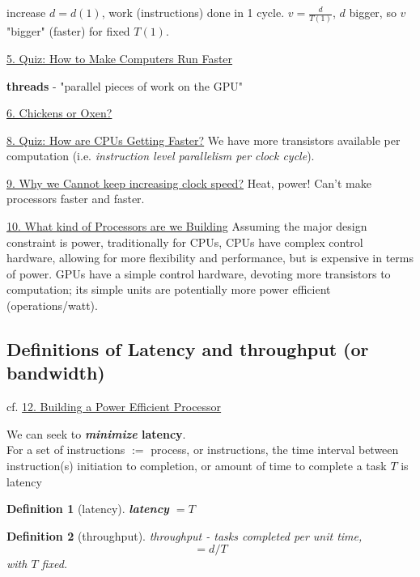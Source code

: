 \documentclass[10pt]{amsart}
\newtheorem{definition}{Definition}
\begin{document}
\begin{multicols*}{2}
increase $d=d(1)$, work (instructions) done in 1 cycle.  $v=\frac{d}{T(1)}$, $d$ bigger, so $v$ "bigger" (faster) for fixed $T(1)$.  

\href{https://classroom.udacity.com/courses/cs344/lessons/55120467/concepts/659387650923}{5. Quiz: How to Make Computers Run Faster} 

\textbf{threads} - "parallel pieces of work on the GPU"

\href{https://classroom.udacity.com/courses/cs344/lessons/55120467/concepts/670611900923}{6. Chickens or Oxen?}

\href{https://classroom.udacity.com/courses/cs344/lessons/55120467/concepts/668222780923}{8. Quiz: How are CPUs Getting Faster?}  We have more transistors available per computation (i.e. \emph{instruction level parallelism per clock cycle}).  

\href{https://classroom.udacity.com/courses/cs344/lessons/55120467/concepts/670462960923}{9. Why we Cannot keep increasing clock speed?} Heat, power!  Can't make processors faster and faster.  

\href{https://classroom.udacity.com/courses/cs344/lessons/55120467/concepts/668323280923}{10. What kind of Processors are we Building} Assuming the major design constraint is power, traditionally for CPUs, CPUs have complex control hardware, allowing for more flexibility and performance, but is expensive in terms of power.  GPUs have a simple control hardware, devoting more transistors to computation; its simple units are potentially more power efficient (operations/watt).  

\subsection{Definitions of Latency and throughput (or bandwidth)}

cf. 
\href{https://classroom.udacity.com/courses/cs344/lessons/55120467/concepts/669874580923}{12. Building a Power Efficient Processor}

We can seek to \textbf{\emph{minimize} latency}.   \\

For a set of instructions $:= $ process, or instructions, the time interval between instruction(s) initiation to completion, or amount of time to complete a task $T$ is latency
\begin{definition}[latency]
\textbf{latency} $ = T$
\end{definition}

\begin{definition}[throughput]
throughput - tasks completed per unit time, 
\begin{equation}
= d/T 
\end{equation}
with $T$ fixed.  


\end{definition}
\end{multicols*}
\end{document}
